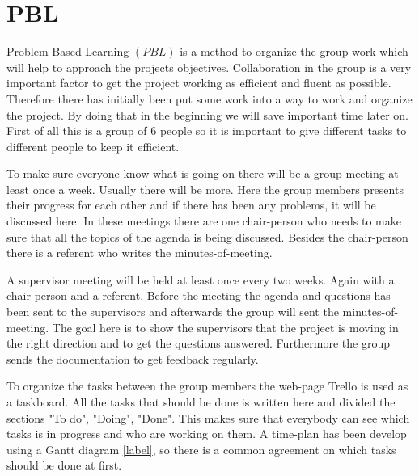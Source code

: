 \section{PBL} 

Problem Based Learning $(PBL)$ is a method to organize the group work which will help to approach the projects objectives. Collaboration in the group is a very important factor to get the project working as efficient and fluent as possible.
Therefore there has initially been put some work into a way to work and organize the project. By doing that in the beginning we will save important time later on.
First of all this is a group of 6 people so it is important to give different tasks to different people to keep it efficient. 

To make sure everyone know what is going on there will be a group meeting at least once a week. Usually there will be more. Here the group members presents their progress for each other and if there has been any problems, it will be discussed here. In these meetings there are one chair-person who needs to make sure that all the topics of the agenda is being discussed. Besides the chair-person there is a referent who writes the minutes-of-meeting. 

A supervisor meeting will be held at least once every two weeks. Again with a chair-person and a referent. Before the meeting the agenda and questions has been sent to the supervisors and afterwards the group will sent the minutes-of-meeting. The goal here is to show the supervisors that the project is moving in the right direction and to get the questions answered. Furthermore the group sends the documentation to get feedback regularly.

To organize the tasks between the group members the web-page Trello is used as a taskboard. All the tasks that should be done is written here and divided the sections "To do", "Doing", "Done". This makes sure that everybody can see which tasks is in progress and who are working on them. A time-plan has been develop using a Gantt diagram \ref{label}, so there is a common agreement on which tasks should be done at first.              
